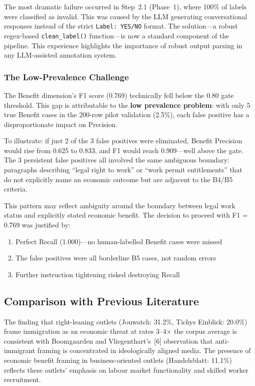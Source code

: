 The most dramatic failure occurred in Step~2.1 (Phase~1), where 100\% of labels were classified as invalid. This was caused by the LLM generating conversational responses instead of the strict \texttt{Label: YES/NO} format. The solution---a robust regex-based \texttt{clean\_label()} function---is now a standard component of the pipeline. This experience highlights the importance of robust output parsing in any LLM-assisted annotation system.

\subsubsection{The Low-Prevalence Challenge}

The Benefit dimension's F1 score (0.769) technically fell below the 0.80 gate threshold. This gap is attributable to the \textbf{low prevalence problem}: with only 5 true Benefit cases in the 200-row pilot validation (2.5\%), each false positive has a disproportionate impact on Precision.

To illustrate: if just 2 of the 3 false positives were eliminated, Benefit Precision would rise from 0.625 to 0.833, and F1 would reach 0.909---well above the gate. The 3 persistent false positives all involved the same ambiguous boundary: paragraphs describing ``legal right to work'' or ``work permit entitlements'' that do not explicitly name an economic outcome but are adjacent to the B4/B5 criteria.

This pattern may reflect ambiguity around the boundary between legal work status and explicitly stated economic benefit. The decision to proceed with F1 = 0.769 was justified by:
\begin{enumerate}
    \item Perfect Recall (1.000)---no human-labelled Benefit cases were missed
    \item The false positives were all borderline B5 cases, not random errors
    \item Further instruction tightening risked destroying Recall
\end{enumerate}

\subsection{Comparison with Previous Literature}

The finding that right-leaning outlets (Jouwatch: 31.2\%, Tichys Einblick: 20.0\%) frame immigration as an economic threat at rates 3--4$\times$ the corpus average is consistent with Boomgaarden and Vliegenthart's~[6] observation that anti-immigrant framing is concentrated in ideologically aligned media. The presence of economic benefit framing in business-oriented outlets (Handelsblatt: 11.1\%) reflects these outlets' emphasis on labour market functionality and skilled worker recruitment.


